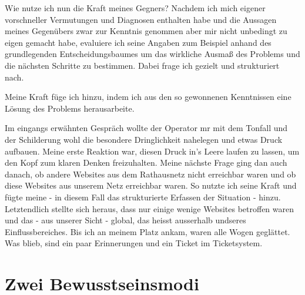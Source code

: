 \begin{normaltext}
Wie nutze ich nun die Kraft meines Gegners? Nachdem ich mich eigener
vorschneller Vermutungen und Diagnosen enthalten habe und die Aussagen meines
Gegenübers zwar zur Kenntnis genommen aber mir nicht unbedingt zu eigen
gemacht habe, evaluiere ich seine Angaben zum Beispiel anhand des
grundlegenden Entscheidungsbaumes um das wirkliche Ausmaß des Problems und die
nächsten Schritte zu bestimmen. Dabei frage ich gezielt und strukturiert nach.

Meine Kraft füge ich hinzu, indem ich aus den so gewonnenen Kenntnissen eine
Lösung des Problems herausarbeite.

Im eingangs erwähnten Gespräch wollte der Operator mr mit dem Tonfall und der
Schilderung wohl die besondere Dringlichkeit nahelegen und etwas Druck
aufbauen. Meine erste Reaktion war, diesen Druck in's Leere laufen zu lassen,
um den Kopf zum klaren Denken freizuhalten. Meine nächste Frage ging dan auch
danach, ob andere Websites aus dem Rathausnetz nicht erreichbar waren und ob
diese Websites aus unserem Netz erreichbar waren. So nutzte ich seine Kraft
und fügte meine - in diesem Fall das strukturierte Erfassen der Situation -
hinzu. Letztendlich stellte sich heraus, dass nur einige wenige Websites
betroffen waren und das - aus unserer Sicht - global, das heisst ausserhalb
undseres Einflussbereiches. Bis ich an meinem Platz ankam, waren alle Wogen
geglättet. Was blieb, sind ein paar Erinnerungen und ein Ticket im
Ticketsystem.
\end{normaltext}

\section{Zwei Bewusstseinsmodi}
\label{sec:zwei-bewusstseinsmodi}

